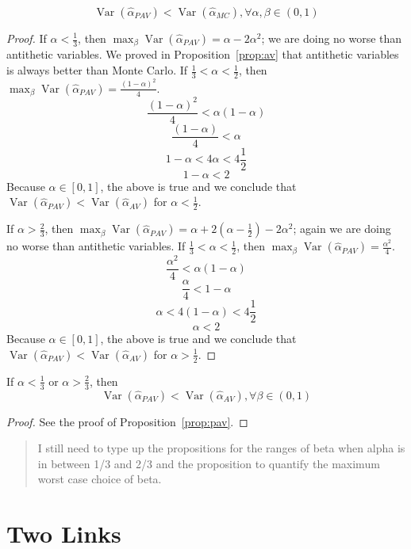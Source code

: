 \documentclass[11pt]{article}
\DeclareMathOperator{\var}{Var}
\begin{document}
\begin{proposition}\label{prop:pav}
\[
\var\left(\hat{\alpha}_{PAV}\right) < \var\left(\hat{\alpha}_{MC}\right), \forall \alpha,\beta \in (0,1)
\]
\end{proposition}
\begin{proof}
If $\alpha < \frac{1}{3}$, then $\displaystyle\max_{\beta}\var\left(\hat{\alpha}_{PAV}\right)=\alpha-2\alpha^2$; we are doing no worse than antithetic variables. We proved in Proposition~\ref{prop:av} that antithetic variables is always better than Monte Carlo. If $\frac{1}{3} < \alpha < \frac{1}{2}$, then $\displaystyle\max_{\beta}\var\left(\hat{\alpha}_{PAV}\right)=\frac{(1-\alpha)^2}{4}$.
\[
\frac{(1-\alpha)^2}{4} < \alpha(1-\alpha)
\]
\[
\frac{(1-\alpha)}{4} < \alpha
\]
\[
1-\alpha < 4\alpha < 4\frac{1}{2}
\]
\[
1-\alpha < 2
\]
Because $\alpha\in[0,1]$, the above is true and we conclude that $\var\left(\hat{\alpha}_{PAV}\right) < \var\left(\hat{\alpha}_{AV}\right)$ for $\alpha < \frac{1}{2}$.

If $\alpha > \frac{2}{3}$, then  $\displaystyle\max_{\beta}\var\left(\hat{\alpha}_{PAV}\right)=\alpha+2(\alpha-\frac{1}{2})-2\alpha^2$; again we are doing no worse than antithetic variables. If $\frac{1}{3} < \alpha < \frac{1}{2}$, then $\displaystyle\max_{\beta}\var\left(\hat{\alpha}_{PAV}\right)=\frac{\alpha^2}{4}$.
\[
\frac{\alpha^2}{4} < \alpha(1-\alpha)
\]
\[
\frac{\alpha}{4} < 1-\alpha
\]
\[
\alpha < 4(1-\alpha) < 4\frac{1}{2}
\]
\[
\alpha < 2
\]
Because $\alpha\in[0,1]$, the above is true and we conclude that $\var\left(\hat{\alpha}_{PAV}\right) < \var\left(\hat{\alpha}_{AV}\right)$ for $\alpha > \frac{1}{2}$.

\end{proof}
\begin{corollary}
If $\alpha < \frac{1}{3}$ or $\alpha > \frac{2}{3}$, then
\[
\var\left(\hat{\alpha}_{PAV}\right) < \var\left(\hat{\alpha}_{AV}\right), \forall \beta \in (0,1)
\]
\end{corollary}
\begin{proof}
See the proof of Proposition~\ref{prop:pav}.
\end{proof}

\begin{quote}
I still need to type up the propositions for the ranges of beta when alpha is in between 1/3 and 2/3 and the proposition to quantify the maximum worst case choice of beta.
\end{quote}

\section{Two Links}
\end{document}
